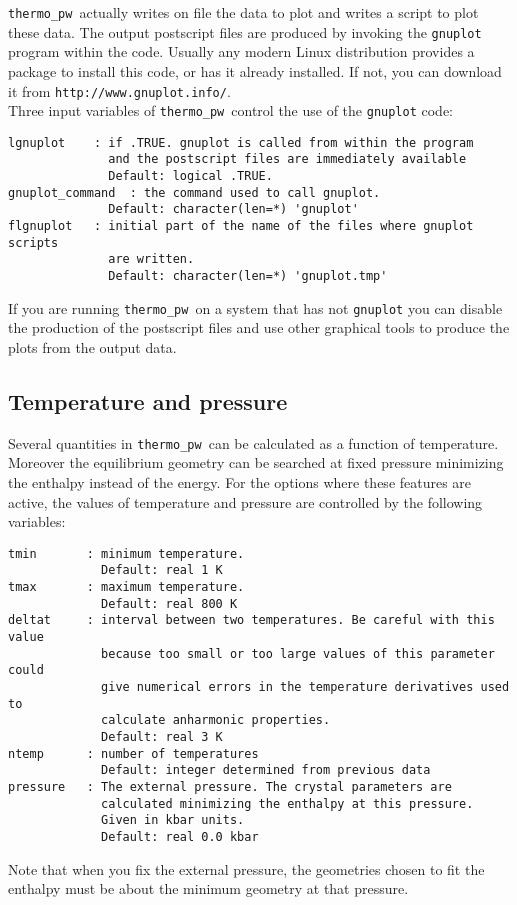 \documentclass[12pt,a4paper]{article}
\def\thermo{\texttt{thermo\_pw}}
\begin{document}
\thermo\ actually writes on file the data to plot and writes a script to plot
these data. The output postscript files are produced by invoking the 
\texttt{gnuplot} program within the code. Usually any modern Linux 
distribution provides a package to install this code, or has it already 
installed. If not, you can download it from 
\texttt{http://www.gnuplot.info/}. \\
Three input variables of \thermo\ control 
the use of the \texttt{gnuplot} code:

\begin{verbatim}
lgnuplot    : if .TRUE. gnuplot is called from within the program
              and the postscript files are immediately available
              Default: logical .TRUE.
gnuplot_command  : the command used to call gnuplot.
              Default: character(len=*) 'gnuplot'
flgnuplot   : initial part of the name of the files where gnuplot scripts 
              are written.
              Default: character(len=*) 'gnuplot.tmp'
\end{verbatim}
If you are running \thermo\ on a system that has not \texttt{gnuplot}
you can disable the production of the postscript files and use other
graphical tools to produce the plots from the output data. 

\subsection{\color{web-blue}Temperature and pressure}
Several quantities in \thermo\ can be calculated as a function of temperature.
Moreover the equilibrium geometry can be searched at fixed pressure 
minimizing the enthalpy instead of the energy.
For the options where these features are active, the values of temperature
and pressure are controlled by the following variables:
\begin{verbatim}
tmin       : minimum temperature.
             Default: real 1 K
tmax       : maximum temperature.
             Default: real 800 K
deltat     : interval between two temperatures. Be careful with this value
             because too small or too large values of this parameter could 
             give numerical errors in the temperature derivatives used to 
             calculate anharmonic properties.
             Default: real 3 K
ntemp      : number of temperatures
             Default: integer determined from previous data
pressure   : The external pressure. The crystal parameters are
             calculated minimizing the enthalpy at this pressure. 
             Given in kbar units. 
             Default: real 0.0 kbar
\end{verbatim}
Note that when you fix the external pressure, the geometries chosen to 
fit the enthalpy must be about the minimum geometry at that pressure.
\end{document}
